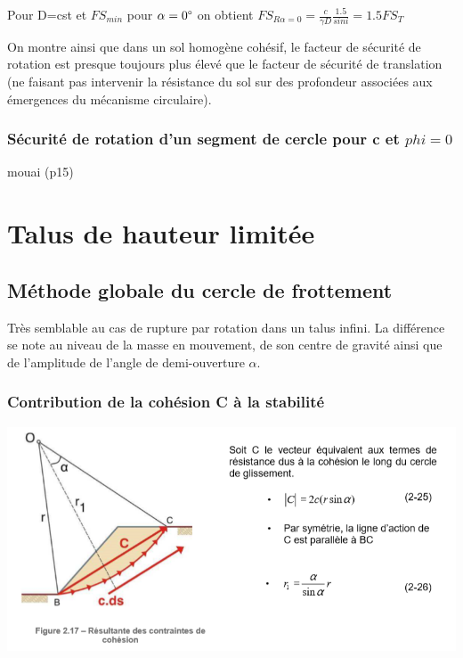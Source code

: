 Pour D=cst et $FS_{min}$ pour $\alpha = 0\degree$ on obtient $FS_{R \alpha = 0} = \frac{c}{\gamma D} \frac{1.5}{sin i} = 1.5 FS_T$

On montre ainsi que dans un sol homogène cohésif, le facteur de sécurité de rotation est presque toujours plus élevé que le facteur de sécurité de translation (ne faisant pas intervenir la résistance du sol sur des profondeur associées aux émergences du mécanisme circulaire).

\subsubsection{Sécurité de rotation d'un segment de cercle pour c et $phi = 0$}

mouai (p15)

\section{Talus de hauteur limitée}

\subsection{Méthode globale du cercle de frottement}

Très semblable au cas de rupture par rotation dans un talus infini. La différence se note au niveau de la masse en mouvement, de son centre de gravité ainsi que de l'amplitude de l'angle de demi-ouverture $\alpha$.

\subsubsection{Contribution de la cohésion C à la stabilité}

\begin{center}
\includegraphics [scale=0.8]{pictures/t.PNG}
\end{center}

